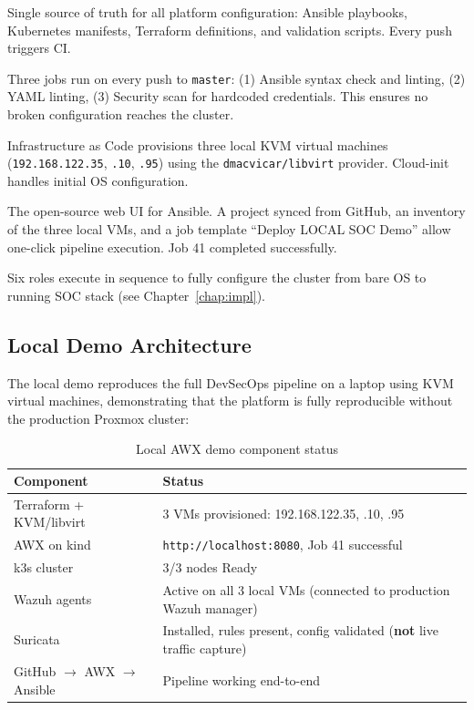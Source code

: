 \documentclass[12pt,a4paper]{report}
\begin{document}
\begin{description}[leftmargin=2cm]
  \item[GitHub] Single source of truth for all platform configuration: Ansible playbooks, Kubernetes manifests, Terraform definitions, and validation scripts. Every push triggers CI.
  \item[GitHub Actions] Three jobs run on every push to \texttt{master}: (1) Ansible syntax check and linting, (2) YAML linting, (3) Security scan for hardcoded credentials. This ensures no broken configuration reaches the cluster.
  \item[Terraform + KVM/libvirt] Infrastructure as Code provisions three local KVM virtual machines (\texttt{192.168.122.35}, \texttt{.10}, \texttt{.95}) using the \texttt{dmacvicar/libvirt} provider. Cloud-init handles initial OS configuration.
  \item[AWX (Ansible Tower)] The open-source web UI for Ansible. A project synced from GitHub, an inventory of the three local VMs, and a job template ``Deploy LOCAL SOC Demo'' allow one-click pipeline execution. Job 41 completed successfully.
  \item[Ansible] Six roles execute in sequence to fully configure the cluster from bare OS to running SOC stack (see Chapter~\ref{chap:impl}).
\end{description}

\subsection{Local Demo Architecture}

The local demo reproduces the full DevSecOps pipeline on a laptop using KVM virtual machines, demonstrating that the platform is fully reproducible without the production Proxmox cluster:

\begin{table}[H]
\centering
\caption{Local AWX demo component status}
\begin{tabular}{ll}
\toprule
\textbf{Component} & \textbf{Status} \\
\midrule
Terraform + KVM/libvirt & 3 VMs provisioned: 192.168.122.35, .10, .95 \\
AWX on kind & \texttt{http://localhost:8080}, Job 41 successful \\
k3s cluster & 3/3 nodes Ready \\
Wazuh agents & Active on all 3 local VMs (connected to production Wazuh manager) \\
Suricata & Installed, rules present, config validated (\textbf{not} live traffic capture) \\
GitHub $\rightarrow$ AWX $\rightarrow$ Ansible & Pipeline working end-to-end \\
\bottomrule
\end{tabular}
\label{tab:localdemo}
\end{table}
\end{document}
